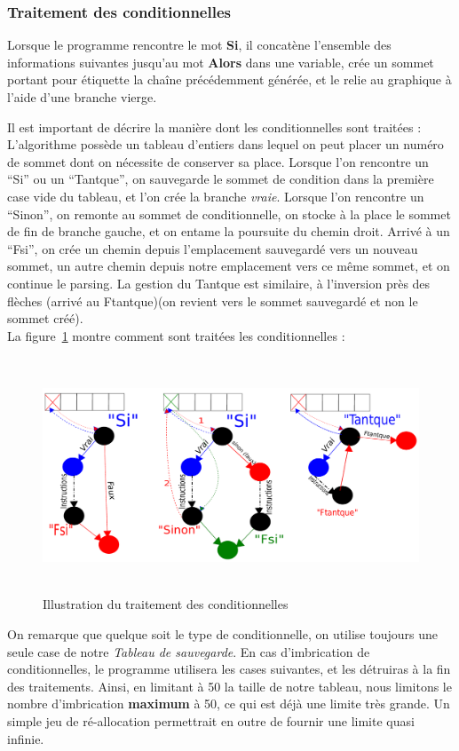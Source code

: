 \documentclass[a4paper,11pt]{article}
\begin{document}
		\subsubsection{Traitement des conditionnelles}
		Lorsque le programme rencontre le mot \textbf{Si}, il concatène l'ensemble des informations suivantes jusqu'au mot \textbf{Alors} dans une variable, crée un sommet portant pour étiquette la chaîne précédemment générée, et le relie au graphique à l'aide d'une branche vierge.
		
		Il est important de décrire la manière dont les conditionnelles sont traitées :\\
		L'algorithme possède un tableau d'entiers dans lequel on peut placer un numéro de sommet dont on nécessite de conserver sa place. Lorsque l'on rencontre un ``Si'' ou un ``Tantque'', on sauvegarde le sommet de condition dans la première case vide du tableau, et l'on crée la branche \textit{vraie}. Lorsque l'on rencontre un ``Sinon'', on remonte au sommet de conditionnelle, on stocke à la place le sommet de fin de branche gauche, et on entame la poursuite du chemin droit. Arrivé à un ``Fsi'', on crée un chemin depuis l'emplacement sauvegardé vers un nouveau sommet, un autre chemin depuis notre emplacement vers ce même sommet, et on continue le parsing. La gestion du Tantque est similaire, à l'inversion près des flèches (arrivé au Ftantque)(on revient vers le sommet sauvegardé et non le sommet créé).\\
		 La figure~\ref{image_cond} montre comment sont traitées les conditionnelles :
		\begin{figure}[!ht]\begin{center}\includegraphics[width=17cm,height=7cm]{dessin.pdf}\caption{Illustration du traitement des conditionnelles}\label{image_cond}\end{center}\end{figure}
	On remarque que quelque soit le type de conditionnelle, on utilise toujours une seule case de notre \textit{Tableau de sauvegarde}. En cas d'imbrication de conditionnelles, le programme utilisera les cases suivantes, et les détruiras à la fin des traitements. Ainsi, en limitant à 50 la taille de notre tableau, nous limitons le nombre d'imbrication \textbf{maximum} à 50, ce qui est déjà une limite très grande. Un simple jeu de ré-allocation permettrait en outre de fournir une limite quasi infinie.
\end{document}
